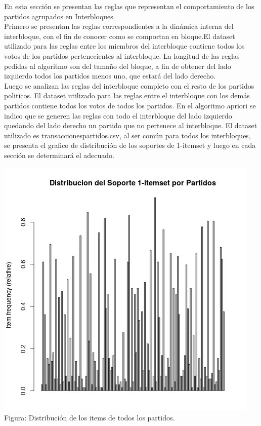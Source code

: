 \documentclass{endm}
\begin{document}
En esta sección se presentan las reglas que representan el comportamiento de los partidos agrupados en Interbloques.\\

Primero se presentan las reglas correspondientes a la dinámica interna del interbloque, con el fin de conocer como se comportan en bloque.El dataset utilizado para las reglas entre los miembros del interbloque contiene todos los votos de los partidos pertenecientes al interbloque. La longitud de las reglas pedidas al algoritmo son del tamaño del bloque, a fin de obtener del lado izquierdo todos los partidos menos uno, que estará del lado derecho.\\

Luego se analizan las reglas del interbloque completo con el resto de los partidos politicos. El dataset utilizado para las reglas entre el interbloque con los demás partidos contiene todos los votos de todos los partidos. En el algoritmo apriori se indico que se generen las reglas con todo el interbloque del lado izquierdo quedando del lado derecho un partido que no pertenece al interbloque. El dataset utilizado es transaccionespartidos.csv, al ser común para todos los interbloques, se presenta el grafico de distribución de los soportes de 1-itemset y luego en cada sección se determinará el adecuado.\\

\begin{center}
\includegraphics[scale=0.5]{graficos/soportesParaPartidos.png} \\
\scriptsize{Figura: Distribución de los items de todos los partidos.} \\
\end{center}
\end{document}
